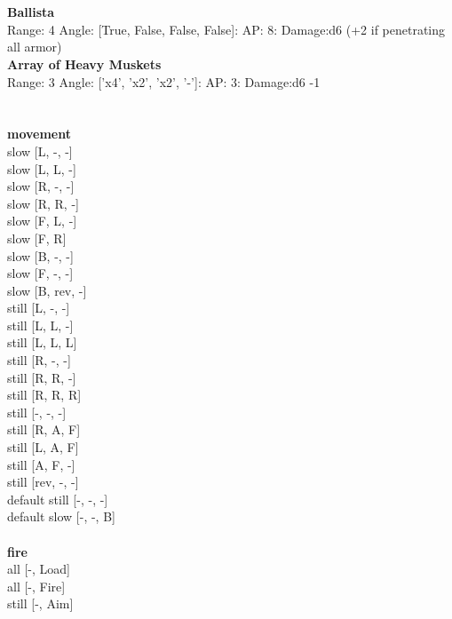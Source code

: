 \ \\

\ \\
{\bf Ballista } \\



Range: 4  Angle: [True, False, False, False]: AP: 8: Damage:d6 (+2 if penetrating all armor) \\




{\bf Array of Heavy Muskets } \\



Range: 3  Angle: ['x4', 'x2', 'x2', '-']: AP: 3: Damage:d6 -1 \\




 
\ \\



\ \\ {\bf movement } \\
slow [L, -, -] \\
slow [L, L, -] \\
slow [R, -, -] \\
slow [R, R, -] \\
slow [F, L, -] \\
slow [F, R] \\
slow [B, -, -] \\
slow [F, -, -] \\
slow [B, rev, -] \\
still [L, -, -] \\
still [L, L, -] \\
still [L, L, L] \\
still [R, -, -] \\
still [R, R, -] \\
still [R, R, R] \\
still [-, -, -] \\
still [R, A, F] \\
still [L, A, F] \\
still [A, F, -] \\
still [rev, -, -] \\
default still [-, -, -] \\
default slow [-, -, B] \\
\ \\ {\bf fire } \\
all [-, Load] \\
all [-, Fire] \\
still [-, Aim] \\


